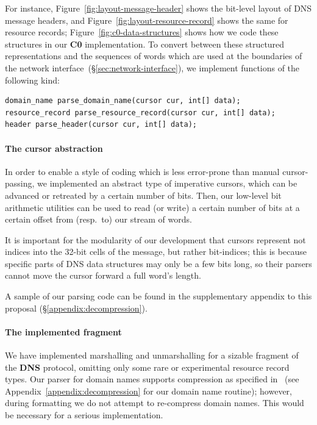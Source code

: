 \documentclass{article}
\newcommand\Kwd[1]{{\sffamily\bfseries{#1}}}
\begin{document}
For instance, Figure~\ref{fig:layout-message-header} shows the
bit-level layout of DNS message headers, and
Figure~\ref{fig:layout-resource-record} shows the same for resource
records; Figure~\ref{fig:c0-data-structures} shows how we code these
structures in our \Kwd{C0} implementation. To convert between these
structured representations and the sequences of words which are used
at the boundaries of the network
interface~(\S\ref{sec:network-interface}), we implement functions of
the following kind:

\begin{lstlisting}
domain_name parse_domain_name(cursor cur, int[] data);
resource_record parse_resource_record(cursor cur, int[] data);
header parse_header(cursor cur, int[] data);
\end{lstlisting}

\paragraph{The cursor abstraction}
In order to enable a style of coding which is less error-prone than
manual cursor-passing, we implemented an abstract type of imperative
cursors, which can be advanced or retreated by a certain number of
bits. Then, our low-level bit arithmetic utilities can be used to read
(or write) a certain number of bits at a certain offset from (resp.\
to) our stream of words.

It is important for the modularity of our development that cursors
represent not indices into the 32-bit cells of the message, but rather
bit-indices; this is because specific parts of DNS data structures may
only be a few bits long, so their parsers cannot move the cursor
forward a full word's length.

A sample of our parsing code can be found in the supplementary
appendix to this proposal (\S\ref{appendix:decompression}).

\paragraph{The implemented fragment}

We have implemented marshalling and unmarshalling for a sizable
fragment of the \Kwd{DNS} protocol, omitting only some rare or
experimental resource record types. Our parser for domain names
supports compression as specified in~\cite{rfc:1035} (see
Appendix~\ref{appendix:decompression} for our domain name routine);
however, during formatting we do not attempt to re-compress domain
names. This would be necessary for a serious implementation.
\end{document}
